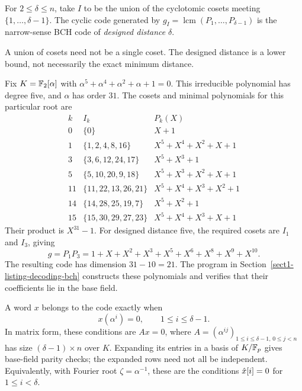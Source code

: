 
\begin{defn}
For $2\leq\delta\leq n$, take $I$ to be the union of the cyclotomic
cosets meeting $\{1,\ldots,\delta-1\}$. The cyclic code generated by
$g_I=\operatorname{lcm}(P_1,\ldots,P_{\delta-1})$ is the narrow-sense
BCH code of \emph{designed distance} $\delta$.
\end{defn}
A union of cosets need not be a single coset. The designed distance is a
lower bound, not necessarily the exact minimum distance.


\begin{exmp}
Fix $K=\mathbb{F}_2[\alpha]$ with
$\alpha^5+\alpha^4+\alpha^2+\alpha+1=0$. This irreducible polynomial
has degree five, and $\alpha$ has order $31$. The cosets and minimal
polynomials for this particular root are
\[
\begin{array}{c|l|l}
 k&I_k&P_k(X)\\\hline
 0&\{0\}&X+1\\
 1&\{1,2,4,8,16\}&X^5+X^4+X^2+X+1\\
 3&\{3,6,12,24,17\}&X^5+X^3+1\\
 5&\{5,10,20,9,18\}&X^5+X^3+X^2+X+1\\
 11&\{11,22,13,26,21\}&X^5+X^4+X^3+X^2+1\\
 14&\{14,28,25,19,7\}&X^5+X^2+1\\
 15&\{15,30,29,27,23\}&X^5+X^4+X^3+X+1
\end{array}
\]
Their product is $X^{31}-1$. For designed distance five, the required
cosets are $I_1$ and $I_3$, giving
\[
 g=P_1P_3=1+X+X^2+X^3+X^5+X^6+X^8+X^9+X^{10}.
\]
The resulting code has dimension $31-10=21$.
The program in Section~\ref{sect1-listing-decoding-bch} constructs these
polynomials and verifies that their coefficients lie in the base field.
\end{exmp}

A word $x$ belongs to the code exactly when
\begin{equation}
\label{eq-condition-defn-codes-bch}
 x(\alpha^i)=0,\qquad 1\leq i\leq\delta-1.
\end{equation}
In matrix form, these conditions are $Ax=0$, where
$A=(\alpha^{ij})_{1\leq i\leq\delta-1,\,0\leq j<n}$ has size
$(\delta-1)\times n$ over $K$. Expanding its entries in a basis of
$K/\mathbb{F}_p$ gives base-field parity checks; the expanded rows need not all
be independent. Equivalently, with Fourier root $\zeta=\alpha^{-1}$,
these are the conditions $\hat{x}[i]=0$ for $1\leq i<\delta$.

